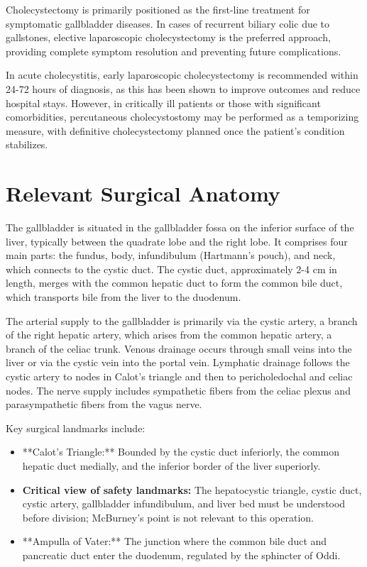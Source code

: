Cholecystectomy is primarily positioned as the first-line treatment for symptomatic gallbladder diseases. In cases of recurrent biliary colic due to gallstones, elective laparoscopic cholecystectomy is the preferred approach, providing complete symptom resolution and preventing future complications. 

In acute cholecystitis, early laparoscopic cholecystectomy is recommended within 24-72 hours of diagnosis, as this has been shown to improve outcomes and reduce hospital stays. However, in critically ill patients or those with significant comorbidities, percutaneous cholecystostomy may be performed as a temporizing measure, with definitive cholecystectomy planned once the patient's condition stabilizes.

\section*{Relevant Surgical Anatomy}
The gallbladder is situated in the gallbladder fossa on the inferior surface of the liver, typically between the quadrate lobe and the right lobe. It comprises four main parts: the fundus, body, infundibulum (Hartmann's pouch), and neck, which connects to the cystic duct. The cystic duct, approximately 2-4 cm in length, merges with the common hepatic duct to form the common bile duct, which transports bile from the liver to the duodenum. 

The arterial supply to the gallbladder is primarily via the cystic artery, a branch of the right hepatic artery, which arises from the common hepatic artery, a branch of the celiac trunk. Venous drainage occurs through small veins into the liver or via the cystic vein into the portal vein. Lymphatic drainage follows the cystic artery to nodes in Calot's triangle and then to pericholedochal and celiac nodes. The nerve supply includes sympathetic fibers from the celiac plexus and parasympathetic fibers from the vagus nerve. 

Key surgical landmarks include:

\begin{itemize}
  \item **Calot's Triangle:** Bounded by the cystic duct inferiorly, the common hepatic duct medially, and the inferior border of the liver superiorly.
  \item \textbf{Critical view of safety landmarks:} The hepatocystic triangle, cystic duct, cystic artery, gallbladder infundibulum, and liver bed must be understood before division; McBurney's point is not relevant to this operation.
  \item **Ampulla of Vater:** The junction where the common bile duct and pancreatic duct enter the duodenum, regulated by the sphincter of Oddi.
\end{itemize}

